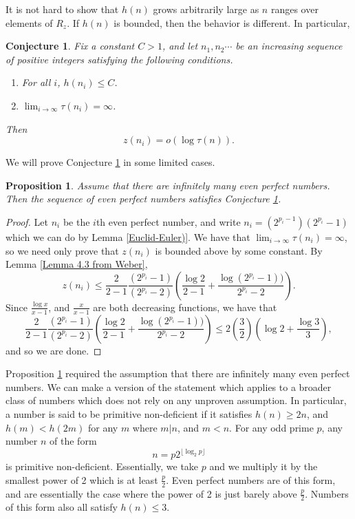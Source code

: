 \documentclass{article}
\newtheorem{proposition}[theorem]{Proposition}
\newtheorem{conjecture}[theorem]{Conjecture}
\begin{document}
It is not hard to show that $h(n)$ grows arbitrarily large as $n$ ranges over elements of $R_z$. If $h(n)$ is bounded, then the behavior is different. In particular,

\begin{conjecture} Fix a constant $C>1$, and let $n_1, n_2 \cdots$ be an increasing sequence of positive integers satisfying the following conditions.\label{z small compared to tau when h fixed}
\begin{enumerate}
    \item For all $i$, $h(n_i) \leq C$.
    \item $\lim_{i \rightarrow \infty} \tau(n_i)=\infty$.
\end{enumerate}
 Then $$z(n_i) = o(\log \tau(n)).$$
\end{conjecture}

We will prove Conjecture \ref{z small compared to tau when h fixed} in some limited cases.

\begin{proposition} Assume that there are infinitely many even perfect numbers. Then the sequence of even perfect numbers satisfies Conjecture \ref{z small compared to tau when h fixed}. \label{Even perfects satisfy z small compared to tau}
\end{proposition}
\begin{proof} Let $n_i$ be the $i$th even perfect number, and write $n_i=(2^{p_i-1})(2^{p_i}-1)$ which we can do by Lemma \ref{Euclid-Euler)}. We have  that $\lim_{i \rightarrow \infty} \tau(n_i)=\infty$, so we need only prove that $z(n_i)$ is bounded above by some constant. By Lemma \ref{Lemma 4.3 from Weber},
$$z(n_i) \leq \frac{2}{2-1}\frac{(2^{p_i}-1)}{(2^{p_i}-2)}\left(\frac{\log 2}{2-1} + \frac{\log(2^{p_i}-1))}{2^{p_i}-2}\right).$$
Since $\frac{\log x}{x-1}$, and $\frac{x}{x-1}$ are both decreasing functions, we have that 
$$\frac{2}{2-1}\frac{(2^{p_i}-1)}{(2^{p_i}-2)}\left(\frac{\log 2}{2-1} + \frac{\log(2^{p_i}-1))}{2^{p_i}-2}\right) \leq 2\left(\frac{3}{2}\right)\left(\log 2 + \frac{\log 3}{3}\right),$$ and so we are done.
\end{proof}

Proposition \ref{Even perfects satisfy z small compared to tau} required the assumption that there are infinitely many even perfect numbers. We can make a version of the statement which applies to a broader class of numbers which does not rely on any unproven assumption. In particular, a number is said to be primitive non-deficient if it satisfies $h(n) \geq 2n$, and $h(m)< h(2m)$ for any $m$ where $m|n$, and $m<n$. For any odd prime $p$, any number $n$ of the form $$n=p2^{\lfloor \log_2 p \rfloor}$$ is primitive non-deficient. Essentially, we take $p$ and we multiply it by the smallest power of 2 which is at least $\frac{p}{2}$. Even perfect numbers are of this form, and are essentially the case where the power of 2 is just barely above $\frac{p}{2}$. Numbers of this form also all satisfy $h(n) \leq 3$.
\end{document}
